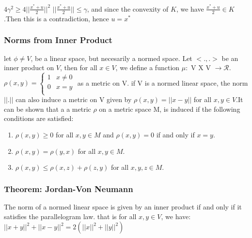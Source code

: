 \documentclass[12pt]{article}
\begin{document}
$4\gamma^2 \ge 4||\frac{x^* + u}{2}||^2$
$||\frac{x^* + u}{2}|| \le \gamma$, and since the convexity of $K$, we have $\frac{x^* + u}{2} \in K$.Then this is a contradiction, hence $u = x^*$

\subsubsection*{Norms from Inner Product}
let $\phi \ne V$, be a linear space, but necesarily a normed space. Let $<.,.>$ be an inner product on $V$, then for all $x \in V$, we define a function $\mu: \text{ V } \text{X} \text{ V } \to \mathcal{R}$. \\
\begin{math}
    \rho(x,y) = 
\begin{cases} 
    1 & x\ne 0 \\
    0 & x=y \\
  
 \end{cases}
\end{math}
 as a metric on V. if V is a normed linear space, the norm $||.||$ can also induce a metric on V given by $\rho(x,y) = ||x-y||$ for all $x,y \in V$.It can be shown that a a metric $\rho$ on a metric space M, is induced if the following conditions are satisfied:

    \begin{enumerate}
        \item $\rho(x,y) \ge 0$ for all $x,y \in M$ and $\rho(x,y) = 0$ if and only if $x = y$.
        \item $\rho(x,y) = \rho(y,x)$ for all $x,y \in M$.
        \item $\rho(x,y) \le \rho(x,z) + \rho(z,y)$ for all $x,y,z \in M$.
    \end{enumerate}

\subsubsection*{Theorem: Jordan-Von Neumann}
The norm of a normed linear space is given by an inner product if and only if it satisfies the parallelogram law. that is for all $x,y \in V$, we have:
$||x+y||^2 + ||x-y||^2 = 2(||x||^2 + ||y||^2)$
\end{document}
